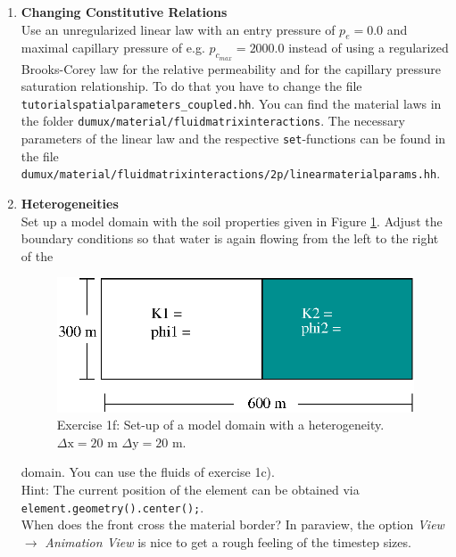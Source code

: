 \begin{enumerate}
\item \textbf{Changing Constitutive Relations} \\
  Use an unregularized linear law with an entry pressure of $p_e = 0.0$ and maximal capillary pressure of e.g. $p_{c_{max}} = 2000.0$ instead of using a
 regularized Brooks-Corey law for the
  relative permeability and for the capillary pressure saturation relationship. To do that you have
  to change the file \texttt{tutorialspatialparameters\_coupled.hh}. 
 You can find the material laws in the folder 
  \verb+dumux/material/fluidmatrixinteractions+. The necessary parameters
of the linear law and the respective \texttt{set}-functions can be found
 in the file \\
 \verb+dumux/material/fluidmatrixinteractions/2p/linearmaterialparams.hh+.
 
\item \textbf{Heterogeneities}  \\
  Set up a model domain with the soil properties given in Figure
  \ref{tutorial-coupled:exercise1_d}. Adjust the boundary conditions
  so that water is again flowing from the left to the right of the
\begin{figure}[h]
\centering
\includegraphics[width=0.5\linewidth,keepaspectratio]{EPS/exercise1_c.eps}
\caption{Exercise 1f: Set-up of a model domain with a heterogeneity. $\Delta \text{x} = 20$ m $\Delta \text{y} = 20$ m.}\label{tutorial-coupled:exercise1_d}
\end{figure}
domain. You can use the fluids of exercise 1c).\\
Hint: The current position of the element can be obtained via \texttt{element.geometry().center();}.\\
When does the front cross the material border? In paraview, the option \textit{View} $\rightarrow$ \textit{Animation View} is nice to get a rough feeling of the timestep sizes.
\end{enumerate}

